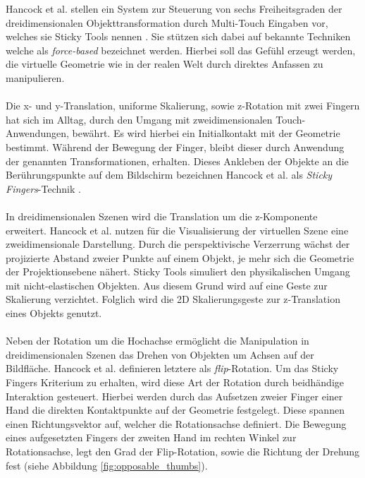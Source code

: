 Hancock et al. stellen ein System zur Steuerung von sechs Freiheitsgraden der dreidimensionalen Objekttransformation durch Multi-Touch Eingaben vor, welches sie Sticky Tools nennen \cite{hancock:2009}. Sie stützen sich dabei auf bekannte Techniken welche als \emph{force-based} bezeichnet werden. Hierbei soll das Gefühl erzeugt werden, die virtuelle Geometrie wie in der realen Welt durch direktes Anfassen zu manipulieren. 
\\\\
Die x- und y-Translation, uniforme Skalierung, sowie z-Rotation mit zwei Fingern hat sich im Alltag, durch den Umgang mit zweidimensionalen Touch-Anwendungen, bewährt. Es wird hierbei ein Initialkontakt mit der Geometrie bestimmt. Während der Bewegung der Finger, bleibt dieser durch Anwendung der genannten Transformationen, erhalten. Dieses Ankleben der Objekte an die Berührungspunkte auf dem Bildschirm bezeichnen Hancock et al. als \emph{Sticky Fingers}-Technik \cite{hancock:2007,hancock:2009}.
\\\\
In dreidimensionalen Szenen wird die Translation um die z-Komponente erweitert. Hancock et al. nutzen für die Visualisierung der virtuellen Szene eine zweidimensionale Darstellung. Durch die perspektivische Verzerrung wächst der projizierte Abstand zweier Punkte auf einem Objekt, je mehr sich die Geometrie der Projektionsebene nähert. Sticky Tools simuliert den physikalischen Umgang mit nicht-elastischen Objekten. Aus diesem Grund wird auf eine Geste zur Skalierung verzichtet. Folglich wird die 2D Skalierungsgeste zur z-Translation eines Objekts genutzt.
\\\\
Neben der Rotation um die Hochachse ermöglicht die Manipulation in dreidimensionalen Szenen das Drehen von Objekten um Achsen auf der Bildfläche. Hancock et al. definieren letztere als \emph{flip}-Rotation. Um das Sticky Fingers Kriterium zu erhalten, wird diese Art der Rotation durch beidhändige Interaktion gesteuert. Hierbei werden durch das Aufsetzen zweier Finger einer Hand die direkten Kontaktpunkte auf der Geometrie festgelegt. Diese spannen einen Richtungsvektor auf, welcher die Rotationsachse definiert. Die Bewegung eines aufgesetzten Fingers der zweiten Hand im rechten Winkel zur Rotationsachse, legt den Grad der Flip-Rotation, sowie die Richtung der Drehung fest (siehe Abbildung \ref{fig:opposable_thumbs}).

